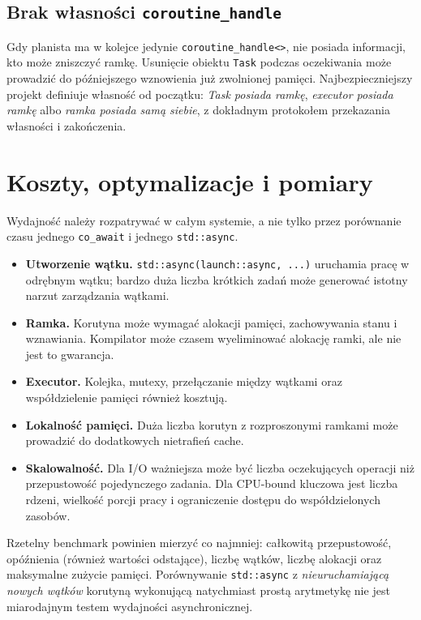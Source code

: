 \subsection{Brak własności \texttt{coroutine\_handle}}

Gdy planista ma w kolejce jedynie \texttt{coroutine\_handle<>},
nie posiada informacji, kto może zniszczyć ramkę. Usunięcie
obiektu \texttt{Task} podczas oczekiwania może prowadzić do
późniejszego wznowienia już zwolnionej pamięci.
Najbezpieczniejszy projekt definiuje własność od początku:
\emph{Task posiada ramkę}, \emph{executor posiada ramkę} albo
\emph{ramka posiada samą siebie}, z dokładnym protokołem przekazania
własności i zakończenia.

\section{Koszty, optymalizacje i pomiary}
\label{sec:cpp15-performance}

Wydajność należy rozpatrywać w całym systemie, a nie tylko przez
porównanie czasu jednego \texttt{co\_await} i jednego \texttt{std::async}.
\begin{itemize}
\item \textbf{Utworzenie wątku.} \texttt{std::async(launch::async, ...)}
      uruchamia pracę w odrębnym wątku; bardzo duża liczba krótkich
      zadań może generować istotny narzut zarządzania wątkami.
\item \textbf{Ramka.} Korutyna może wymagać alokacji pamięci,
      zachowywania stanu i wznawiania. Kompilator może czasem
      wyeliminować alokację ramki, ale nie jest to gwarancja.
\item \textbf{Executor.} Kolejka, mutexy, przełączanie między wątkami
      oraz współdzielenie pamięci również kosztują.
\item \textbf{Lokalność pamięci.} Duża liczba korutyn z rozproszonymi
      ramkami może prowadzić do dodatkowych nietrafień cache.
\item \textbf{Skalowalność.} Dla I/O ważniejsza może być liczba
      oczekujących operacji niż przepustowość pojedynczego zadania.
      Dla CPU-bound kluczowa jest liczba rdzeni, wielkość porcji pracy
      i ograniczenie dostępu do współdzielonych zasobów.
\end{itemize}

Rzetelny benchmark powinien mierzyć co najmniej: całkowitą
przepustowość, opóźnienia (również wartości odstające), liczbę wątków,
liczbę alokacji oraz maksymalne zużycie pamięci. Porównywanie
\texttt{std::async} z \emph{nieuruchamiającą nowych wątków} korutyną
wykonującą natychmiast prostą arytmetykę nie jest miarodajnym
testem wydajności asynchronicznej.

